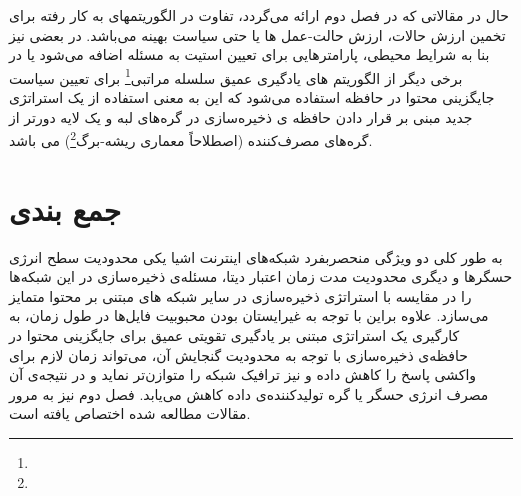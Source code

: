  حال در  مقالاتی که در فصل دوم ارائه می‌گردد، تفاوت در الگوریتمهای به کار رفته برای تخمین ارزش حالات، ارزش حالت-عمل ها یا حتی سیاست بهینه می‌باشد. در بعضی نیز بنا به شرایط محیطی، پارامترهایی برای تعیین استیت به مسئله اضافه می‌شود یا در برخی دیگر از الگوریتم های یادگیری عمیق سلسله مراتبی\footnote{} برای تعیین سیاست جایگزینی محتوا در حافظه استفاده می‌شود که این به معنی استفاده از یک استراتژی جدید مبنی بر قرار دادن حافظه ی ذخیره‌سازی در گره‌های لبه و یک لایه دورتر از گره‌های مصرف‌کننده (اصطلاحاً معماری ریشه-برگ\footnote{}) می باشد.

\section{جمع بندی}
به طور کلی دو ویژگی منحصربفرد شبکه‌های اینترنت اشیا یکی محدودیت سطح انرژی حسگرها و دیگری محدودیت مدت زمان اعتبار دیتا، مسئله‌ی ذخیره‌سازی در این شبکه‌ها را در مقایسه با استراتژی ذخیره‌سازی در سایر شبکه های مبتنی بر محتوا متمایز می‌سازد. علاوه براین با توجه به غیرایستان بودن محبوبیت فایل‌ها در طول زمان، به کارگیری یک استراتژی مبتنی بر یادگیری تقویتی عمیق برای جایگزینی محتوا در حافظه‌ی ذخیره‌سازی با توجه به محدودیت گنجایش آن، می‌تواند زمان لازم برای واکشی پاسخ را کاهش داده و نیز ترافیک شبکه را متوازن‌تر نماید و در نتیجه‌ی آن مصرف انرژی حسگر یا گره تولیدکننده‌ی داده کاهش می‌یابد. فصل دوم نیز به مرور مقالات مطالعه شده اختصاص یافته است.






